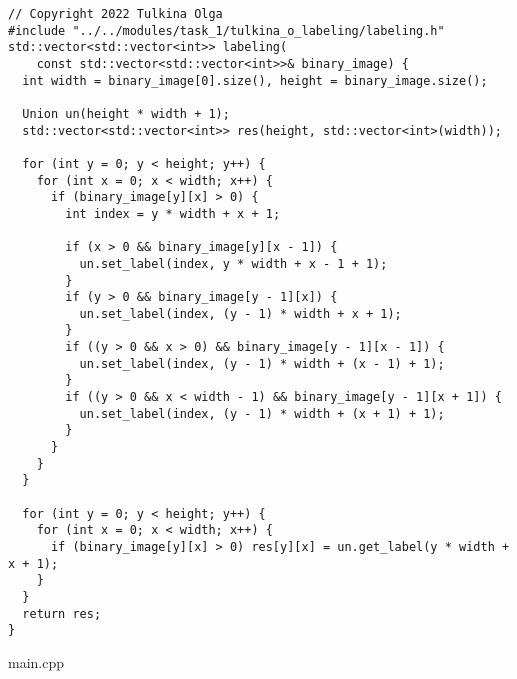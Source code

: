 \documentclass[12pt]{article}
\begin{document}
\begin{lstlisting}
// Copyright 2022 Tulkina Olga
#include "../../modules/task_1/tulkina_o_labeling/labeling.h"
std::vector<std::vector<int>> labeling(
    const std::vector<std::vector<int>>& binary_image) {
  int width = binary_image[0].size(), height = binary_image.size();

  Union un(height * width + 1);
  std::vector<std::vector<int>> res(height, std::vector<int>(width));

  for (int y = 0; y < height; y++) {
    for (int x = 0; x < width; x++) {
      if (binary_image[y][x] > 0) {
        int index = y * width + x + 1;

        if (x > 0 && binary_image[y][x - 1]) {
          un.set_label(index, y * width + x - 1 + 1);
        }
        if (y > 0 && binary_image[y - 1][x]) {
          un.set_label(index, (y - 1) * width + x + 1);
        }
        if ((y > 0 && x > 0) && binary_image[y - 1][x - 1]) {
          un.set_label(index, (y - 1) * width + (x - 1) + 1);
        }
        if ((y > 0 && x < width - 1) && binary_image[y - 1][x + 1]) {
          un.set_label(index, (y - 1) * width + (x + 1) + 1);
        }
      }
    }
  }

  for (int y = 0; y < height; y++) {
    for (int x = 0; x < width; x++) {
      if (binary_image[y][x] > 0) res[y][x] = un.get_label(y * width + x + 1);
    }
  }
  return res;
}
\end{lstlisting}
main.cpp
\end{document}
